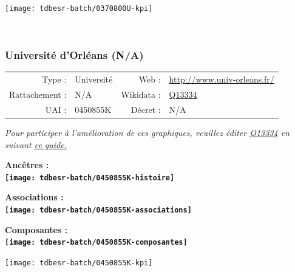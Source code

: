 \documentclass[12pt,french,]{article}
\begin{document}
\begin{center}\texttt{[image: tdbesr-batch/0370800U-kpi]} \end{center}\checkoddpage

\ifoddpage \fi ~\newpage  

\hypertarget{universituxe9-dorluxe9ans-na}{%
\subsubsection{Université d'Orléans
(N/A)}\label{universituxe9-dorluxe9ans-na}}

\begin{tabular*}{\textwidth}{rp{5cm}rl}  
\hline  
Type : & Université & Web : &\href{http://www.univ-orleans.fr/}{http://www.univ-orleans.fr/} \\  
Rattachement : & N/A & Wikidata : & \href{https://www.wikidata.org/entity/Q13334}{Q13334} \\  
UAI : & 0450855K & Décret : & N/A \\  
\hline  
\end{tabular*}

\textit{\scriptsize Pour participer à l'amélioration de ces graphiques, veuillez éditer  \href{https://www.wikidata.org/entity/Q13334}{Q13334}  en suivant \href{https://github.com/cpesr/wikidataESR/blob/master/Rmd/wikidataESR.md}{ce guide.}}

\vspace{1cm}  
\begin{minipage}[b]{0.50\textwidth}\begin{center} \bf Ancêtres : \\  
\texttt{[image: tdbesr-batch/0450855K-histoire]} \end{center}\end{minipage}\begin{minipage}[b]{0.50\textwidth}\begin{center} \bf Associations : \\  
\texttt{[image: tdbesr-batch/0450855K-associations]} \end{center}\end{minipage}

\hrulefill

\begin{center} \bf Composantes : \\  
\texttt{[image: tdbesr-batch/0450855K-composantes]} \end{center}

\begin{center}\texttt{[image: tdbesr-batch/0450855K-kpi]} \end{center}\checkoddpage
\end{document}
